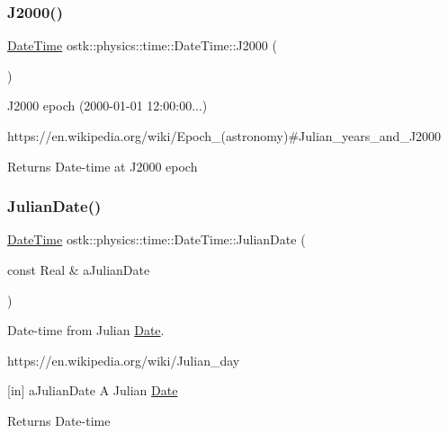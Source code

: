 \subsubsection{\texorpdfstring{J2000()}{J2000()}}
{\footnotesize\ttfamily \hyperlink{classostk_1_1physics_1_1time_1_1_date_time}{Date\+Time} ostk\+::physics\+::time\+::\+Date\+Time\+::\+J2000 (\begin{DoxyParamCaption}{ }\end{DoxyParamCaption})\hspace{0.3cm}{\ttfamily [static]}}



J2000 epoch (2000-\/01-\/01 12\+:00\+:00...) 

https\+://en.wikipedia.\+org/wiki/\+Epoch\+\_\+(astronomy)\#\+Julian\+\_\+years\+\_\+and\+\_\+\+J2000

\begin{DoxyReturn}{Returns}
Date-\/time at J2000 epoch 
\end{DoxyReturn}
\mbox{\label{classostk_1_1physics_1_1time_1_1_date_time_a12ae2e3669cf32a915079228979d67ae}} 
\subsubsection{\texorpdfstring{Julian\+Date()}{JulianDate()}}
{\footnotesize\ttfamily \hyperlink{classostk_1_1physics_1_1time_1_1_date_time}{Date\+Time} ostk\+::physics\+::time\+::\+Date\+Time\+::\+Julian\+Date (\begin{DoxyParamCaption}\item[{const Real \&}]{a\+Julian\+Date }\end{DoxyParamCaption})\hspace{0.3cm}{\ttfamily [static]}}



Date-\/time from Julian \hyperlink{classostk_1_1physics_1_1time_1_1_date}{Date}. 

https\+://en.wikipedia.\+org/wiki/\+Julian\+\_\+day

\mbox{[}in\mbox{]} a\+Julian\+Date A Julian \hyperlink{classostk_1_1physics_1_1time_1_1_date}{Date} \begin{DoxyReturn}{Returns}
Date-\/time 
\end{DoxyReturn}
\mbox{\label{classostk_1_1physics_1_1time_1_1_date_time_a9584452e9ad5f915c5a540a070910556}} 
